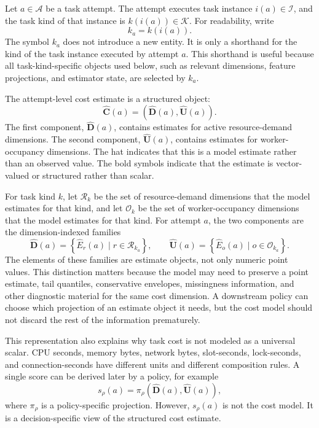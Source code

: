 Let $a \in \mathcal{A}$ be a task attempt. The attempt executes task instance
$i(a) \in \mathcal{I}$, and the task kind of that instance is
$k(i(a)) \in \mathcal{K}$. For readability, write
\[
k_a = k(i(a)).
\]
The symbol $k_a$ does not introduce a new entity. It is only a shorthand for the
kind of the task instance executed by attempt $a$. This shorthand is useful
because all task-kind-specific objects used below, such as relevant dimensions,
feature projections, and estimator state, are selected by $k_a$.

The attempt-level cost estimate is a structured object:
\[
\widehat{\mathbf{C}}(a)
=
\left(
\widehat{\mathbf{D}}(a),
\widehat{\mathbf{U}}(a)
\right).
\]
The first component, $\widehat{\mathbf{D}}(a)$, contains estimates for active
resource-demand dimensions. The second component, $\widehat{\mathbf{U}}(a)$,
contains estimates for worker-occupancy dimensions. The hat indicates that this
is a model estimate rather than an observed value. The bold symbols indicate
that the estimate is vector-valued or structured rather than scalar.

For task kind $k$, let $\mathcal{R}_k$ be the set of resource-demand dimensions
that the model estimates for that kind, and let $\mathcal{O}_k$ be the set of
worker-occupancy dimensions that the model estimates for that kind. For attempt
$a$, the two components are the dimension-indexed families
\[
\widehat{\mathbf{D}}(a)
=
\left\{
\widehat{E}_r(a)
\mid
r \in \mathcal{R}_{k_a}
\right\},
\qquad
\widehat{\mathbf{U}}(a)
=
\left\{
\widehat{E}_o(a)
\mid
o \in \mathcal{O}_{k_a}
\right\}.
\]
The elements of these families are estimate objects, not only numeric point
values. This distinction matters because the model may need to preserve a point
estimate, tail quantiles, conservative envelopes, missingness information, and
other diagnostic material for the same cost dimension. A downstream policy can
choose which projection of an estimate object it needs, but the cost model
should not discard the rest of the information prematurely.

This representation also explains why task cost is not modeled as a universal
scalar. CPU seconds, memory bytes, network bytes, slot-seconds, lock-seconds,
and connection-seconds have different units and different composition rules. A
single score can be derived later by a policy, for example
\[
s_\rho(a)
=
\pi_\rho\!\left(
\widehat{\mathbf{D}}(a),
\widehat{\mathbf{U}}(a)
\right),
\]
where $\pi_\rho$ is a policy-specific projection. However, $s_\rho(a)$ is not
the cost model. It is a decision-specific view of the structured cost estimate.


